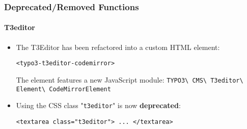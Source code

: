 %

\begin{frame}[fragile]
	\frametitle{Deprecated/Removed Functions}
	\framesubtitle{T3editor}


	\begin{itemize}
		\item The T3Editor has been refactored into a custom HTML element:
\begin{lstlisting}
<typo3-t3editor-codemirror>
\end{lstlisting}

		\itm The element features a new JavaScript module:\newline
			\small
				\texttt{TYPO3\textbackslash
					CMS\textbackslash
					T3editor\textbackslash
					Element\textbackslash
					CodeMirrorElement}
			\normalsize

		\item Using the CSS class "\texttt{t3editor}" is now \textbf{deprecated}:
\begin{lstlisting}
<textarea class="t3editor"> ... </textarea>
\end{lstlisting}

	\end{itemize}

\end{frame}

